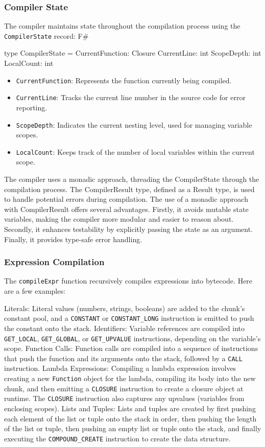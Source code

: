\subsubsection{Compiler State}

The compiler maintains state throughout the compilation process using the \texttt{CompilerState} record:
F#

type CompilerState =
    { CurrentFunction: Closure
      CurrentLine: int
      ScopeDepth: int
      LocalCount: int }

\begin{itemize}
\item \texttt{CurrentFunction}:  Represents the function currently being compiled.
\item \texttt{CurrentLine}: Tracks the current line number in the source code for error reporting.
\item \texttt{ScopeDepth}:  Indicates the current nesting level, used for managing variable scopes.
\item \texttt{LocalCount}: Keeps track of the number of local variables within the current scope.
\end{itemize}

The compiler uses a monadic approach, threading the CompilerState through the compilation process. The CompilerResult type, defined as a Result type, is used to handle potential errors during compilation. The use of a monadic approach with CompilerResult offers several advantages. Firstly, it avoids mutable state variables, making the compiler more modular and easier to reason about. Secondly, it enhances testability by explicitly passing the state as an argument. Finally, it provides type-safe error handling.
\subsubsection{Expression Compilation}

The \texttt{compileExpr} function recursively compiles expressions into bytecode. Here are a few examples:

    Literals: Literal values (numbers, strings, booleans) are added to the chunk's constant pool, and a \texttt{CONSTANT} or \texttt{CONSTANT_LONG} instruction is emitted to push the constant onto the stack.
    Identifiers: Variable references are compiled into \texttt{GET_LOCAL}, \texttt{GET_GLOBAL}, or \texttt{GET_UPVALUE} instructions, depending on the variable's scope.
    Function Calls: Function calls are compiled into a sequence of instructions that push the function and its arguments onto the stack, followed by a \texttt{CALL} instruction.
    Lambda Expressions: Compiling a lambda expression involves creating a new \texttt{Function} object for the lambda, compiling its body into the new chunk, and then emitting a \texttt{CLOSURE} instruction to create a closure object at runtime. The \texttt{CLOSURE} instruction also captures any upvalues (variables from enclosing scopes).
    Lists and Tuples: Lists and tuples are created by first pushing each element of the list or tuple onto the stack in order, then pushing the length of the list or tuple, then pushing an empty list or tuple onto the stack, and finally executing the \texttt{COMPOUND_CREATE} instruction to create the data structure.

